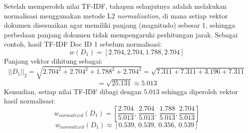 \documentclass[a4paper,12pt]{report}
\numberwithin{equation}{chapter}
\begin{document}
\begin{table}[h!]
\centering
\caption{Nilai Bobot Fitur per Dokumen Sebelum Normalisasi}
\label{tab:tfidf}
\end{table}

 Setelah memperoleh nilai TF-IDF, tahapan selanjutnya adalah melakukan normalisasi menggunakan metode L2 \textit{normalization}, di mana setiap vektor dokumen disesuaikan agar memiliki panjang (magnitudo) sebesar 1, sehingga perbedaan panjang dokumen tidak mempengaruhi perhitungan jarak. Sebagai contoh, hasil TF-IDF Doc ID 1 sebelum normalisasi:
 \[
 w(D_1)=[2.704, 2.704, 1.788, 2.704]
 \]
 Panjang vektor dihitung sebagai:
 \[
 ||D_1||_2 = \sqrt{2.704^2+2.704^2+1.788^2+2.704^2} = \sqrt{7.311+ 7.311 + 3.196 + 7.311}
 \]
 \[
 = \sqrt{25.131} \approx 5.013
 \]
Kemudian, setiap nilai TF-IDF dibagi dengan $5.013$ sehingga diperoleh vektor hasil normalisasi:
\[
w_{normalized}(D_1)= \left[
\frac{2.704}{5.013},\,
\frac{2.704}{5.013},\,
\frac{1.788}{5.013},\frac{2.704}{5.013}
\right]
\]
\[
w_{normalized}(D_1) \approx \left[
0.539,\, 0.539,\ 0.356,\ 0.539
\right]
\]
\end{document}
